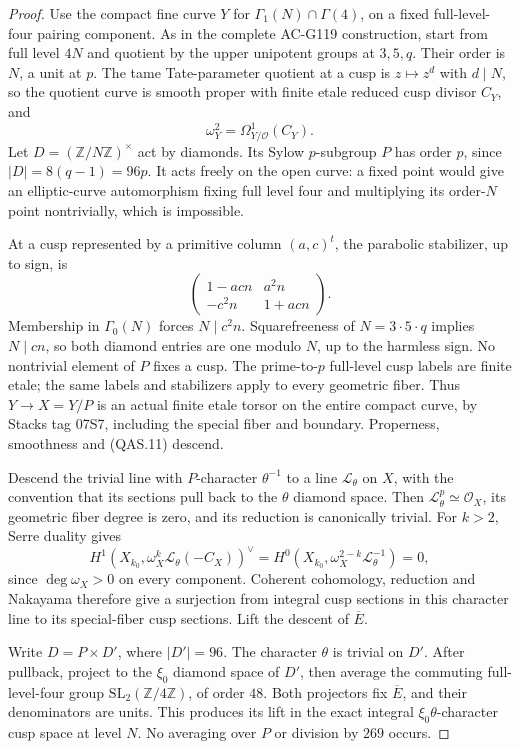 \begin{proof}
Use the compact fine curve \(Y\) for
\(\Gamma_1(N)\cap\Gamma(4)\), on a fixed full-level-four
pairing component.  As in the complete AC-G119 construction,
start from full level \(4N\) and quotient by the upper
unipotent groups at \(3,5,q\).  Their order is \(N\), a unit
at \(p\).  The tame Tate-parameter quotient at a cusp is
\(z\mapsto z^d\) with \(d\mid N\), so the quotient curve is
smooth proper with finite etale reduced cusp divisor \(C_Y\),
and
\[
                   \omega_Y^2=\Omega^1_{Y/\mathcal O}(C_Y).
 \tag{QAS.11}
\]
Let \(D=(\mathbb Z/N\mathbb Z)^\times\) act by diamonds.
Its Sylow \(p\)-subgroup \(P\) has order \(p\), since
\(|D|=8(q-1)=96p\).
It acts freely on the open curve: a fixed point would give
an elliptic-curve automorphism fixing full level four and
multiplying its order-\(N\) point nontrivially, which is impossible.

At a cusp represented by a primitive column \((a,c)^t\), the
parabolic stabilizer, up to sign, is
\[
 \begin{pmatrix}1-acn&a^2n\\-c^2n&1+acn\end{pmatrix}.
 \tag{QAS.12}
\]
Membership in \(\Gamma_0(N)\) forces \(N\mid c^2n\).
Squarefreeness of \(N=3\cdot5\cdot q\) implies \(N\mid cn\),
so both diamond entries are one modulo \(N\), up to the
harmless sign.  No nontrivial element of \(P\) fixes a cusp.
The prime-to-\(p\) full-level cusp labels are finite etale;
the same labels and stabilizers apply to every geometric fiber.
Thus \(Y\to X=Y/P\) is an actual finite etale torsor on the
entire compact curve, by Stacks tag 07S7, including the special
fiber and boundary.  Properness, smoothness and (QAS.11) descend.

Descend the trivial line with \(P\)-character \(\theta^{-1}\)
to a line \(\mathcal L_\theta\) on \(X\), with the convention
that its sections pull back to the \(\theta\) diamond space.
Then \(\mathcal L_\theta^p\simeq\mathcal O_X\), its geometric
fiber degree is zero, and its reduction is canonically trivial.
For \(k>2\), Serre duality gives
\[
 H^1(X_{k_0},\omega_X^k\mathcal L_\theta(-C_X))^\vee
      =H^0(X_{k_0},\omega_X^{2-k}\mathcal L_\theta^{-1})=0,
 \tag{QAS.13}
\]
since \(\deg\omega_X>0\) on every component.  Coherent
cohomology, reduction and Nakayama therefore give a surjection
from integral cusp sections in this character line to its
special-fiber cusp sections.  Lift the descent of \(\overline E\).

Write \(D=P\times D'\), where \(|D'|=96\).
The character \(\theta\) is trivial on \(D'\).
After pullback, project to the \(\xi_0\) diamond space of
\(D'\), then average the commuting full-level-four group
\(\mathrm{SL}_2(\mathbb Z/4\mathbb Z)\), of order \(48\).
Both projectors fix \(\overline E\), and their denominators
are units.  This produces its lift in the exact integral
\(\xi_0\theta\)-character cusp space at level \(N\).
No averaging over \(P\) or division by \(269\) occurs.


\end{proof}
